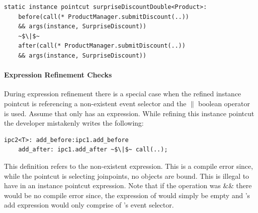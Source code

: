 \begin{lstlisting}[float=h!, moreemph=instance, caption={Adding the same object before and after the same join-point}, label={lst:objversion}]
static instance pointcut surpriseDiscountDouble<Product>:
	before(call(* ProductManager.submitDiscount(..))
	&& args(instance, SurpriseDiscount))
	~$\|$~
	after(call(* ProductManager.submitDiscount(..))
	&& args(instance, SurpriseDiscount))
\end{lstlisting}

\paragraph*{Expression Refinement Checks}During expression refinement there is a special case when the refined instance pointcut is referencing a non-existent event selector and the $\|$ boolean operator is used.  Assume that  only has an  expression. While refining this instance pointcut the developer mistakenly writes the following:

\begin{lstlisting}
ipc2<T>: add_before:ipc1.add_before
	add_after: ipc1.add_after ~$\|$~ call(..);
\end{lstlisting}

This definition refers to the non-existent  expression. This is a compile error since, while the  pointcut is selecting joinpoints, no objects are bound.  This is illegal to have in an instance pointcut expression. Note that if the operation was \&\& there would be no compile error since, the  expression of  would simply be empty and 's add expression would only comprise of 's  event selector.
